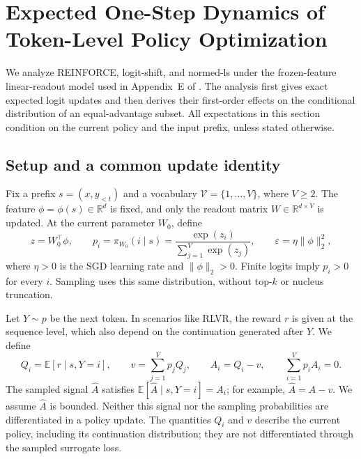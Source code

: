 \section{Expected One-Step Dynamics of Token-Level Policy Optimization}
\label{app:token-learning-dynamics}

We analyze REINFORCE, logit-shift, and normed-ls under the frozen-feature
linear-readout model used in Appendix~E of \citet{ren2025learningdynamics}.
The analysis first gives exact expected logit updates and then derives their
first-order effects on the conditional distribution of an equal-advantage
subset. All expectations in this section condition on the current policy and
the input prefix, unless stated otherwise.

\subsection{Setup and a common update identity}
\label{app:dynamics-setup}

Fix a prefix $s=(x,y_{<t})$ and a vocabulary $\mathcal V=\{1,\ldots,V\}$,
where $V\ge 2$. The feature $\phi=\phi(s)\in\mathbb R^d$ is fixed, and
only the readout matrix $W\in\mathbb R^{d\times V}$ is updated. At the
current parameter $W_0$, define
\begin{equation}
 z=W_0^\top\phi,\qquad
 p_i=\pi_{W_0}(i\mid s)=\frac{\exp(z_i)}{\sum_{j=1}^V\exp(z_j)},
 \qquad \varepsilon=\eta\|\phi\|_2^2,
 \label{eq:dyn-model}
\end{equation}
where $\eta>0$ is the SGD learning rate and $\|\phi\|_2>0$.
Finite logits imply $p_i>0$ for every $i$. Sampling uses this same
distribution, without top-$k$ or nucleus truncation.

Let $Y\sim p$ be the next token. In scenarios like RLVR, the reward $r$ is given at the sequence level, which also depend on the
continuation generated after $Y$. We define
\begin{equation}
 Q_i=\mathbb E[r\mid s,Y=i],\qquad
 v=\sum_{j=1}^V p_jQ_j,\qquad
 A_i=Q_i-v,\qquad \sum_{i=1}^V p_iA_i=0.
 \label{eq:dyn-advantage}
\end{equation}
The sampled signal $\widehat A$ satisfies
$\mathbb E[\widehat A\mid s,Y=i]=A_i$; for example,
$\widehat A=A-v$. We assume $\widehat A$ is bounded. Neither this signal
nor the sampling probabilities are differentiated in a policy update.
The quantities $Q_i$ and $v$ describe the current policy, including its
continuation distribution; they are not differentiated through the sampled
surrogate loss.

